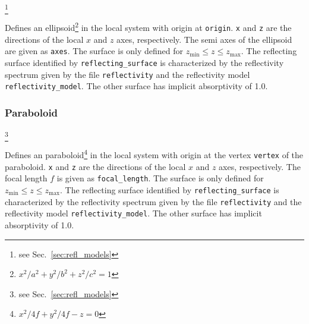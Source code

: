 \documentclass[10pt,a4paper,titlepage]{article}
\begin{document}
\footnote{see Sec.~\ref{sec:refl_models}}


\vspace{0.25cm}
Defines an ellipsoid\footnote{${x^2}/{a^2}+{y^2}/{b^2}+{z^2}/{c^2}=1$} in the local system with origin at {\tt origin}. {\tt x} and {\tt z} are the directions of the local $x$ and $z$ axes, respectively. The semi axes of the ellipsoid are given as {\tt axes}. The surface is only defined for $z_\mathrm{min} \leq z \leq z_\mathrm{max}$. The reflecting surface identified by {\tt reflecting\_surface} is characterized by the reflectivity spectrum given by the file {\tt reflectivity} and the reflectivity model {\tt reflectivity\_model}. The other surface has implicit absorptivity of 1.0.

\subsubsection{Paraboloid}










\footnote{see Sec.~\ref{sec:refl_models}}


\vspace{0.25cm}
Defines an paraboloid\footnote{${x^2}/{4f}+{y^2}/{4f}-z=0$} in the local system with origin at the vertex {\tt vertex} of the paraboloid. {\tt x} and {\tt z} are the directions of the local $x$ and $z$ axes, respectively. The focal length $f$ is given as {\tt focal\_length}. The surface is only defined for $z_\mathrm{min} \leq z \leq z_\mathrm{max}$. The reflecting surface identified by {\tt reflecting\_surface} is characterized by the reflectivity spectrum given by the file {\tt reflectivity} and the reflectivity model {\tt reflectivity\_model}. The other surface has implicit absorptivity of 1.0.
\end{document}
